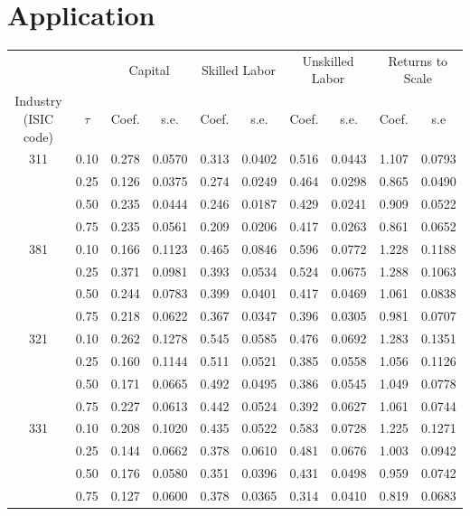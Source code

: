 \documentclass[11pt]{article}
\begin{document}
\section{Application}

\begin{table}[ht]
\centering
\begin{tabular}{cccccccccc}
  \hline\hline & & \multicolumn{2}{c}{Capital}  & \multicolumn{2}{c}{Skilled Labor} & \multicolumn{2}{c}{Unskilled Labor} & \multicolumn{2}{c}{Returns to Scale} \\ \cmidrule(lr){3-4} \cmidrule(lr){5-6} \cmidrule(lr){7-8} \cmidrule(lr){9-10}Industry (ISIC code) & $\tau$ & Coef. & s.e. & Coef. & s.e. & Coef. & s.e. & Coef. & s.e \\ 
  \hline
311 & 0.10 & 0.278 & 0.0570 & 0.313 & 0.0402 & 0.516 & 0.0443 & 1.107 & 0.0793 \\ 
   & 0.25 & 0.126 & 0.0375 & 0.274 & 0.0249 & 0.464 & 0.0298 & 0.865 & 0.0490 \\ 
   & 0.50 & 0.235 & 0.0444 & 0.246 & 0.0187 & 0.429 & 0.0241 & 0.909 & 0.0522 \\ 
   & 0.75 & 0.235 & 0.0561 & 0.209 & 0.0206 & 0.417 & 0.0263 & 0.861 & 0.0652 \\ 
  381 & 0.10 & 0.166 & 0.1123 & 0.465 & 0.0846 & 0.596 & 0.0772 & 1.228 & 0.1188 \\ 
   & 0.25 & 0.371 & 0.0981 & 0.393 & 0.0534 & 0.524 & 0.0675 & 1.288 & 0.1063 \\ 
   & 0.50 & 0.244 & 0.0783 & 0.399 & 0.0401 & 0.417 & 0.0469 & 1.061 & 0.0838 \\ 
   & 0.75 & 0.218 & 0.0622 & 0.367 & 0.0347 & 0.396 & 0.0305 & 0.981 & 0.0707 \\ 
  321 & 0.10 & 0.262 & 0.1278 & 0.545 & 0.0585 & 0.476 & 0.0692 & 1.283 & 0.1351 \\ 
   & 0.25 & 0.160 & 0.1144 & 0.511 & 0.0521 & 0.385 & 0.0558 & 1.056 & 0.1126 \\ 
   & 0.50 & 0.171 & 0.0665 & 0.492 & 0.0495 & 0.386 & 0.0545 & 1.049 & 0.0778 \\ 
   & 0.75 & 0.227 & 0.0613 & 0.442 & 0.0524 & 0.392 & 0.0627 & 1.061 & 0.0744 \\ 
  331 & 0.10 & 0.208 & 0.1020 & 0.435 & 0.0522 & 0.583 & 0.0728 & 1.225 & 0.1271 \\ 
   & 0.25 & 0.144 & 0.0662 & 0.378 & 0.0610 & 0.481 & 0.0676 & 1.003 & 0.0942 \\ 
   & 0.50 & 0.176 & 0.0580 & 0.351 & 0.0396 & 0.431 & 0.0498 & 0.959 & 0.0742 \\ 
   & 0.75 & 0.127 & 0.0600 & 0.378 & 0.0365 & 0.314 & 0.0410 & 0.819 & 0.0683 \\ 
   \hline
\end{tabular}
\end{table}
\end{document}
